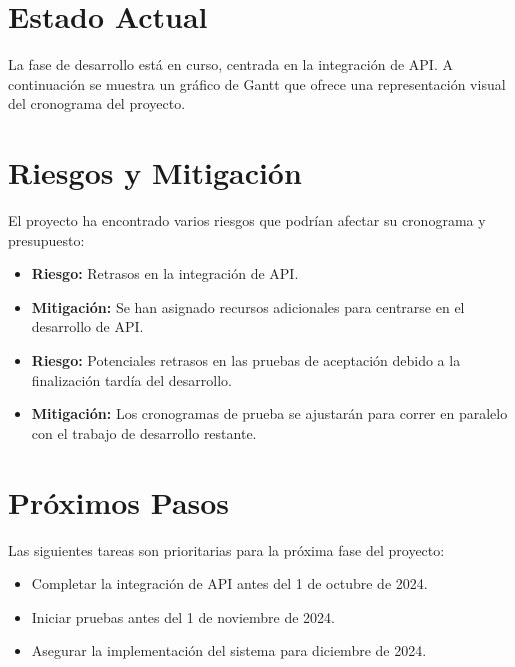 \documentclass[12pt]{article}
\begin{document}
\section{Estado Actual}
La fase de desarrollo está en curso, centrada en la integración de API. A continuación se muestra un gráfico de Gantt que ofrece una representación visual del cronograma del proyecto.

\begin{center}
\end{center}

\section{Riesgos y Mitigación}
El proyecto ha encontrado varios riesgos que podrían afectar su cronograma y presupuesto:
\begin{itemize}
    \item \textbf{Riesgo:} Retrasos en la integración de API.
    \item \textbf{Mitigación:} Se han asignado recursos adicionales para centrarse en el desarrollo de API.
    \item \textbf{Riesgo:} Potenciales retrasos en las pruebas de aceptación debido a la finalización tardía del desarrollo.
    \item \textbf{Mitigación:} Los cronogramas de prueba se ajustarán para correr en paralelo con el trabajo de desarrollo restante.
\end{itemize}

\section{Próximos Pasos}
Las siguientes tareas son prioritarias para la próxima fase del proyecto:
\begin{itemize}
    \item Completar la integración de API antes del 1 de octubre de 2024.
    \item Iniciar pruebas antes del 1 de noviembre de 2024.
    \item Asegurar la implementación del sistema para diciembre de 2024.
\end{itemize}
\end{document}
